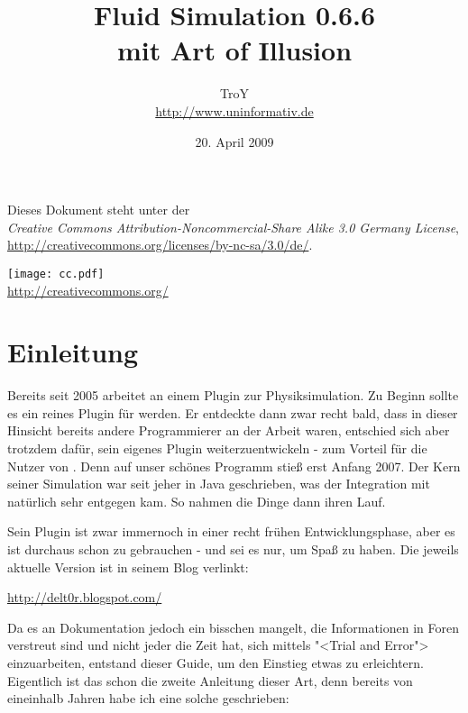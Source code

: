 \documentclass[12pt,a4paper]{scrartcl}
\begin{document}
\author{TroY \\ \url{http://www.uninformativ.de}}
\title{Fluid Simulation 0.6.6 \\ mit Art of Illusion}
\date{20. April 2009}
\maketitle
\thispagestyle{empty}

\vspace{100mm}

\begin{center}
	Dieses Dokument steht unter der \\
	\textit{Creative Commons Attribution-Noncommercial-Share Alike 3.0 Germany License}, \\
	\url{http://creativecommons.org/licenses/by-nc-sa/3.0/de/}.

	\texttt{[image: cc.pdf]} \\
	\url{http://creativecommons.org/}
\end{center}

\pagebreak


\tableofcontents
\thispagestyle{empty}
\pagebreak



\section{Einleitung}
Bereits seit 2005 arbeitet \deltor an einem Plugin zur Physiksimulation.
Zu Beginn sollte es ein reines Plugin für \blender werden. Er entdeckte
dann zwar recht bald, dass in dieser Hinsicht bereits andere
Programmierer an der Arbeit waren, entschied sich aber trotzdem dafür,
sein eigenes Plugin weiterzuentwickeln - zum Vorteil für die Nutzer von
\aoi. Denn auf unser schönes Programm stieß \deltor erst Anfang 2007.
Der Kern seiner Simulation war seit jeher in Java geschrieben, was der
Integration mit \aoi natürlich sehr entgegen kam. So nahmen die Dinge
dann ihren Lauf.

Sein Plugin ist zwar immernoch in einer recht frühen Entwicklungsphase,
aber es ist durchaus schon zu gebrauchen - und sei es nur, um Spaß zu
haben. Die jeweils aktuelle Version ist in seinem Blog verlinkt:

\url{http://delt0r.blogspot.com/}

Da es an Dokumentation jedoch ein bisschen mangelt, die Informationen in
Foren verstreut sind und nicht jeder die Zeit hat, sich mittels "<Trial
and Error"> einzuarbeiten, entstand dieser Guide, um den Einstieg etwas
zu erleichtern. Eigentlich ist das schon die zweite Anleitung dieser
Art, denn bereits von eineinhalb Jahren habe ich eine solche
geschrieben:
\end{document}
